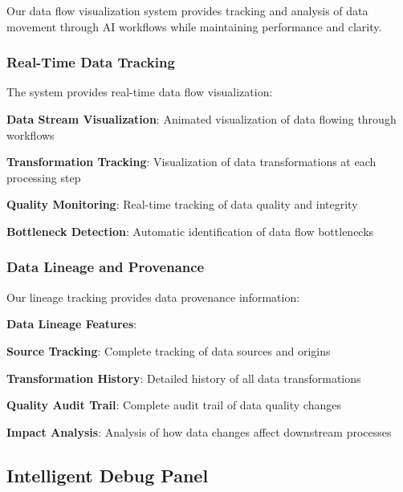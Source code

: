 Our data flow visualization system provides tracking and analysis of data movement through AI workflows while maintaining performance and clarity.

\subsubsection*{Real-Time Data Tracking}

The system provides real-time data flow visualization:

\begin{compactlist}
    \item \textbf{Data Stream Visualization}: Animated visualization of data flowing through workflows
    \item \textbf{Transformation Tracking}: Visualization of data transformations at each processing step
    \item \textbf{Quality Monitoring}: Real-time tracking of data quality and integrity
    \item \textbf{Bottleneck Detection}: Automatic identification of data flow bottlenecks
\end{compactlist}

\subsubsection*{Data Lineage and Provenance}

Our lineage tracking provides data provenance information:

\begin{successbox}
\textbf{Data Lineage Features}:
\begin{compactlist}
    \item \textbf{Source Tracking}: Complete tracking of data sources and origins
    \item \textbf{Transformation History}: Detailed history of all data transformations
    \item \textbf{Quality Audit Trail}: Complete audit trail of data quality changes
    \item \textbf{Impact Analysis}: Analysis of how data changes affect downstream processes
\end{compactlist}
\end{successbox}

\subsection*{Intelligent Debug Panel}

